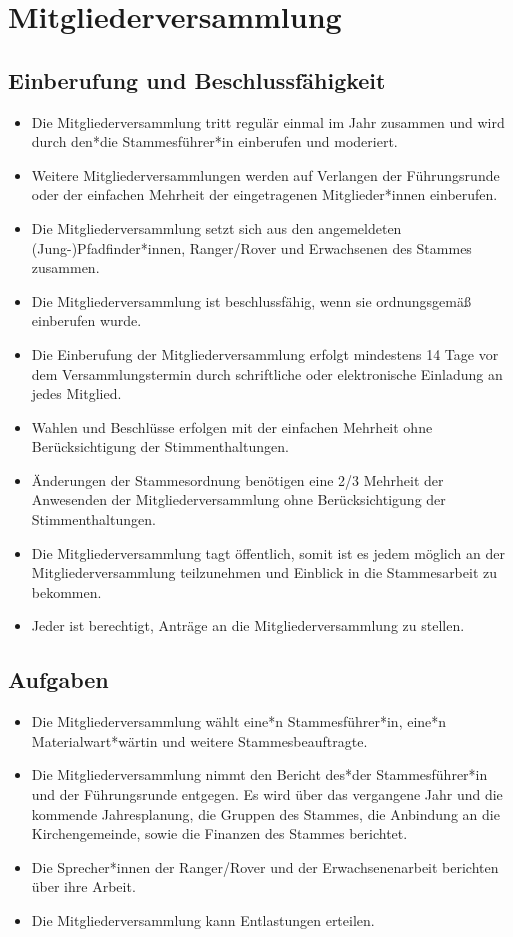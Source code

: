 \documentclass[a4paper]{article}
\begin{document}
\section{Mitgliederversammlung}

    \subsection{Einberufung und Beschlussfähigkeit}
	\begin{itemize}
        \item Die Mitgliederversammlung tritt regulär einmal im Jahr zusammen und wird durch den*die Stammesführer*in einberufen und moderiert.
        \item Weitere Mitgliederversammlungen werden auf Verlangen der Führungsrunde oder der einfachen Mehrheit der eingetragenen Mitglieder*innen einberufen.
        \item Die Mitgliederversammlung setzt sich aus den angemeldeten (Jung-)Pfadfinder*innen, Ranger/Rover und Erwachsenen des Stammes zusammen.
        \item Die Mitgliederversammlung ist beschlussfähig, wenn sie ordnungsgemäß einberufen wurde.
        \item Die Einberufung der Mitgliederversammlung erfolgt mindestens 14 Tage vor dem Versammlungstermin durch schriftliche oder elektronische Einladung an jedes Mitglied.
        \item Wahlen und Beschlüsse erfolgen mit der einfachen Mehrheit ohne Berücksichtigung der Stimmenthaltungen.
        \item Änderungen der Stammesordnung benötigen eine 2/3 Mehrheit der Anwesenden der Mitgliederversammlung ohne Berücksichtigung der Stimmenthaltungen.
        \item Die Mitgliederversammlung tagt öffentlich, somit ist es jedem möglich an der Mitgliederversammlung teilzunehmen und Einblick in die Stammesarbeit zu bekommen.
        \item Jeder ist berechtigt, Anträge an die Mitgliederversammlung zu stellen.
	\end{itemize}
    
    \subsection{Aufgaben} 
	\begin{itemize}
        \item Die Mitgliederversammlung wählt eine*n Stammesführer*in, eine*n Materialwart*wärtin und weitere Stammesbeauftragte.
        \item Die Mitgliederversammlung nimmt den Bericht des*der Stammesführer*in und der Führungsrunde entgegen. Es wird über das vergangene Jahr und die kommende Jahresplanung, die Gruppen des Stammes, die Anbindung an die Kirchengemeinde, sowie die Finanzen des Stammes berichtet.
        \item Die Sprecher*innen der Ranger/Rover und der Erwachsenenarbeit berichten über ihre Arbeit.
        \item Die Mitgliederversammlung kann Entlastungen erteilen.
	\end{itemize}
\end{document}
